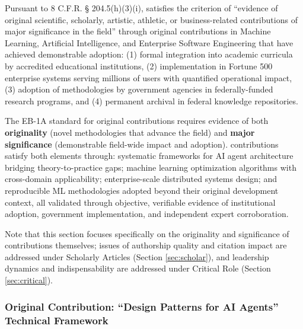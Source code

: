 

Pursuant to 8 C.F.R. § 204.5(h)(3)(i), \dr satisfies the criterion of ``evidence of original scientific, scholarly, artistic, athletic, or business-related contributions of major significance in the field'' through original contributions in Machine Learning, Artificial Intelligence, and Enterprise Software Engineering that have achieved demonstrable adoption: (1) formal integration into academic curricula by accredited educational institutions, (2) implementation in Fortune 500 enterprise systems serving millions of users with quantified operational impact, (3) adoption of methodologies by government agencies in federally-funded research programs, and (4) permanent archival in federal knowledge repositories.

The EB-1A standard for original contributions requires evidence of both \textbf{originality} (novel methodologies that advance the field) and \textbf{major significance} (demonstrable field-wide impact and adoption). \drs contributions satisfy both elements through: systematic frameworks for AI agent architecture bridging theory-to-practice gaps; machine learning optimization algorithms with cross-domain applicability; enterprise-scale distributed systems design; and reproducible ML methodologies adopted beyond their original development context, all validated through objective, verifiable evidence of institutional adoption, government implementation, and independent expert corroboration.

Note that this section focuses specifically on the originality and significance of contributions themselves; issues of authorship quality and citation impact are addressed under Scholarly Articles (Section \ref{sec:scholar}), and leadership dynamics and indispensability are addressed under Critical Role (Section \ref{sec:critical}).


\subsubsection{Original Contribution: ``Design Patterns for AI Agents'' Technical Framework}
\label{original:book}

